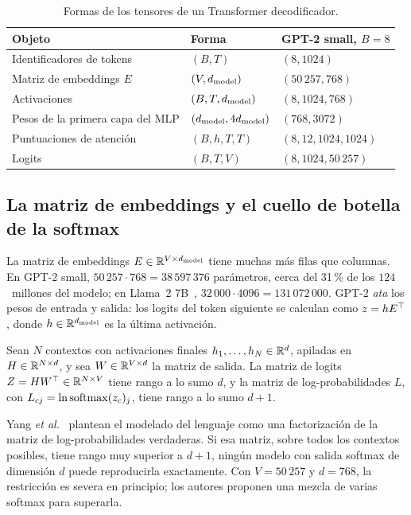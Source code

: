 \begin{table}[h]
\centering\small
\caption{Formas de los tensores de un Transformer decodificador.}\label{tab:formas}
\begin{tabular}{@{}lll@{}}
\toprule
Objeto & Forma & GPT-2 small, $B=8$ \\
\midrule
Identificadores de tokens & $(B,T)$ & $(8,1024)$ \\
Matriz de embeddings $E$ & $(V,d_{\mathrm{model}})$ & $(50\,257,768)$ \\
Activaciones & $(B,T,d_{\mathrm{model}})$ & $(8,1024,768)$ \\
Pesos de la primera capa del MLP & $(d_{\mathrm{model}},4d_{\mathrm{model}})$ & $(768,3072)$ \\
Puntuaciones de atención & $(B,h,T,T)$ & $(8,12,1024,1024)$ \\
Logits & $(B,T,V)$ & $(8,1024,50\,257)$ \\
\bottomrule
\end{tabular}
\end{table}

\addtocounter{figure}{1}%

\subsection*{La matriz de embeddings y el cuello de botella de la softmax}

La matriz de embeddings $E\in\mathbb{R}^{V\times d_{\mathrm{model}}}$ tiene muchas más filas que columnas. En GPT-2 small, $50\,257\cdot 768=38\,597\,376$ parámetros, cerca del 31\,\% de los $124$~millones del modelo; en Llama~2 7B~\cite{llama2}, $32\,000\cdot 4096=131\,072\,000$. GPT-2 \emph{ata} los pesos de entrada y salida: los logits del token siguiente se calculan como $z=hE^{\top}$, donde $h\in\mathbb{R}^{d_{\mathrm{model}}}$ es la última activación.

\begin{proposicion}\label{prop:cuello}
Sean $N$ contextos con activaciones finales $h_1,\dots,h_N\in\mathbb{R}^{d}$, apiladas en $H\in\mathbb{R}^{N\times d}$, y sea $W\in\mathbb{R}^{V\times d}$ la matriz de salida. La matriz de logits $Z=HW^{\top}\in\mathbb{R}^{N\times V}$ tiene rango a lo sumo $d$, y la matriz de log-probabilidades $L$, con $L_{cj}=\ln\operatorname{softmax}(z_c)_j$, tiene rango a lo sumo $d+1$.
\end{proposicion}

Yang \emph{et al.}~\cite{yang-softmax} plantean el modelado del lenguaje como una factorización de la matriz de log-probabilidades verdaderas. Si esa matriz, sobre todos los contextos posibles, tiene rango muy superior a $d+1$, ningún modelo con salida softmax de dimensión $d$ puede reproducirla exactamente. Con $V=50\,257$ y $d=768$, la restricción es severa en principio; los autores proponen una mezcla de varias softmax para superarla.

